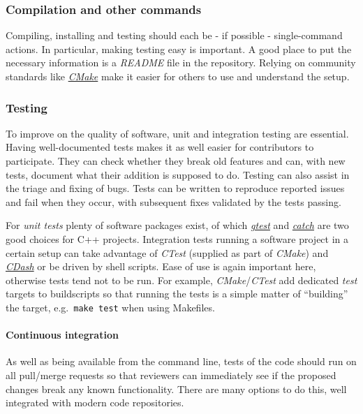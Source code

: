 \documentclass[12pt,a4paper]{article}
\begin{document}
\subsubsection{Compilation and other
commands}\label{compilation-and-other-commands}

Compiling, installing and testing should each be - if possible -
single-command actions. In particular, making testing easy is important.
A good place to put the necessary information is a \emph{README} file in
the repository. Relying on community standards like
\href{https://www.cmake.org}{\emph{CMake}} make it easier for others to
use and understand the setup.

\subsubsection{Testing}\label{testing}

To improve on the quality of software, unit and integration testing are
essential. Having well-documented tests makes it as well easier for
contributors to participate. They can check whether they break old
features and can, with new tests, document what their addition is
supposed to do. Testing can also assist in the triage and fixing of
bugs. Tests can be written to reproduce reported issues and fail when
they occur, with subsequent fixes validated by the tests passing.

For \emph{unit tests} plenty of software packages exist, of which
\href{https://github.com/google/googletest}{\emph{gtest}} and
\href{https://github.com/philsquared/Catch}{\emph{catch}} are two good
choices for C++ projects. Integration tests running a software project
in a certain setup can take advantage of \emph{CTest} (supplied as part
of \emph{CMake}) and \href{http://www.cdash.org}{\emph{CDash}} or be
driven by shell scripts. Ease of use is again important here, otherwise
tests tend not to be run. For example, \emph{CMake}/\emph{CTest} add
dedicated \emph{test} targets to buildscripts so that running the tests
is a simple matter of ``building'' the target, e.g.~\texttt{make\ test}
when using Makefiles.

\paragraph{Continuous integration}\label{continuous-integration}

As well as being available from the command line, tests of the code
should run on all pull/merge requests so that reviewers can immediately
see if the proposed changes break any known functionality. There are
many options to do this, well integrated with modern code repositories.
\end{document}
